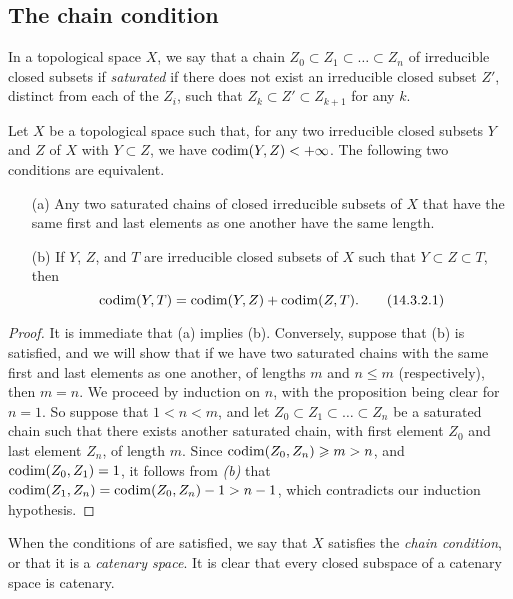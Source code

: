\subsection{The chain condition}
\label{subsection:0.14.3}

\begin{env}[14.3.1]
\label{0.14.3.1}
In a topological space $X$, we say that a chain $Z_0\subset Z_1\subset\ldots\subset Z_n$ of irreducible closed subsets if \emph{saturated} if there does not exist an irreducible closed subset $Z'$, distinct from each of the $Z_i$, such that $Z_k\subset Z'\subset Z_{k+1}$ for any $k$.
\end{env}

\begin{proposition}[14.3.2]
\label{0.14.3.2}
Let $X$ be a topological space such that, for any two irreducible closed subsets $Y$ and $Z$ of $X$ with $Y\subset Z$, we have $\operatorname{codim}(Y,Z)<+\infty$.
The following two conditions are equivalent.
\begin{enumerate}
  \item[{\rm(a)}] Any two saturated chains of closed irreducible subsets of $X$ that have the same first and last elements as one another have the same length.
  \item[{\rm(b)}] If $Y$, $Z$, and $T$ are irreducible closed subsets of $X$ such that $Y\subset Z\subset T$, then
    \[
    \label{eq:0.14.3.2.1}
      \operatorname{codim}(Y,T)=\operatorname{codim}(Y,Z)+\operatorname{codim}(Z,T).
      \tag{14.3.2.1}
    \]
\end{enumerate}
\end{proposition}

\begin{proof}
\label{proof-0.14.3.2}
It is immediate that (a) implies (b).
Conversely, suppose that (b) is satisfied, and we will show that if we have two saturated chains with the same first and last elements as one another, of lengths $m$ and $n\leq m$ (respectively), then $m=n$.
We proceed by induction on $n$, with the proposition being clear for $n=1$.
So suppose that $1<n<m$, and let $Z_0\subset Z_1\subset\ldots\subset Z_n$ be a
saturated chain such that there exists another saturated chain, with first element $Z_0$ and last element $Z_n$, of length $m$.
Since $\operatorname{codim}(Z_0,Z_n)\geqslant m>n$, and $\operatorname{codim}(Z_0,Z_1)=1$, it follows from \emph{(b)} that $\operatorname{codim}(Z_1,Z_n)=\operatorname{codim}(Z_0,Z_n)-1>n-1$, which contradicts our induction hypothesis.
\end{proof}

When the conditions of  are satisfied, we say that $X$ satisfies the \emph{chain condition}, or that it is a \emph{catenary space}.
It is clear that every closed subspace of a catenary space is catenary.

